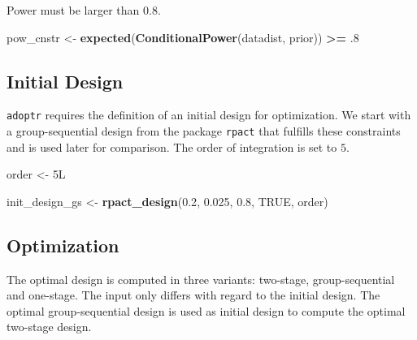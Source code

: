 \documentclass[]{book}
\newenvironment{Shaded}{\begin{snugshade}}{\end{snugshade}}
\newcommand{\FloatTok}[1]{\textcolor[rgb]{0.00,0.00,0.81}{#1}}
\newcommand{\KeywordTok}[1]{\textcolor[rgb]{0.13,0.29,0.53}{\textbf{#1}}}
\newcommand{\NormalTok}[1]{#1}
\newcommand{\OperatorTok}[1]{\textcolor[rgb]{0.81,0.36,0.00}{\textbf{#1}}}
\newcommand{\OtherTok}[1]{\textcolor[rgb]{0.56,0.35,0.01}{#1}}
\newcommand{\StringTok}[1]{\textcolor[rgb]{0.31,0.60,0.02}{#1}}
\begin{document}
Power must be larger than \(0.8\).

\begin{Shaded}
\begin{Highlighting}[]
\NormalTok{pow_cnstr <-}\StringTok{ }\KeywordTok{expected}\NormalTok{(}\KeywordTok{ConditionalPower}\NormalTok{(datadist, prior)) }\OperatorTok{>=}\StringTok{ }\FloatTok{.8}
\end{Highlighting}
\end{Shaded}

\hypertarget{initial-design-6}{%
\subsection{Initial Design}\label{initial-design-6}}

\texttt{adoptr} requires the definition of an initial design for optimization.
We start with a group-sequential design from the package \texttt{rpact} that
fulfills these constraints and is used later for comparison.
The order of integration is set to \(5\).

\begin{Shaded}
\begin{Highlighting}[]
\NormalTok{order <-}\StringTok{ }\NormalTok{5L }

\NormalTok{init_design_gs <-}\StringTok{ }\KeywordTok{rpact_design}\NormalTok{(}\FloatTok{0.2}\NormalTok{, }\FloatTok{0.025}\NormalTok{, }\FloatTok{0.8}\NormalTok{, }\OtherTok{TRUE}\NormalTok{, order)}
\end{Highlighting}
\end{Shaded}

\hypertarget{optimization-6}{%
\subsection{Optimization}\label{optimization-6}}

The optimal design is computed in three variants: two-stage, group-sequential
and one-stage.
The input only differs with regard to the initial design.
The optimal group-sequential design is used as initial design to
compute the optimal two-stage design.
\end{document}
